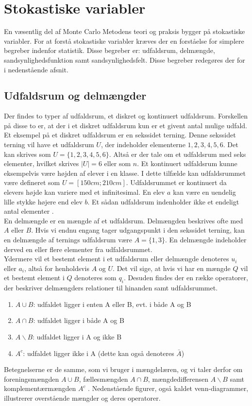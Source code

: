 \documentclass[../../SRP.tex]{subfiles}
\begin{document}
\chapter{Stokastiske variabler}

En væsentlig del af Monte Carlo Metodens teori og praksis bygger på stokastiske variabler. For at forstå stokastiske variabler kræves der en forståelse for simplere begreber indenfor statistik. Disse begreber er: udfaldsrum, delmængde, sandsynlighedsfunktion samt sandsynlighedsfelt. Disse begreber redegøres der for i nedenstående afsnit.

\section{Udfaldsrum og delmængder}

Der findes to typer af udfaldsrum, et diskret og kontinuert udfaldsrum. Forskellen på disse to er, at der i et diskret udfaldsrum kun er et givent antal mulige udfald. Et eksempel på et diskret udfaldsrum er en sekssidet terning. Denne sekssidet terning vil have et udfaldsrum $U$, der indeholder elementerne $1,2,3,4,5,6$. Det kan skrives som $U = \{1,2,3,4,5,6\}$. Altså er der tale om et udfaldsrum med seks elementer, hvilket skrives $|U| = 6$ eller som $n$. Et kontinuert udfaldsrum kunne eksempelvis være højden af elever i en klasse. I dette tilfælde kan udfaldsrummet være defineret som $U = [150cm;210cm]$. Udfaldsrummet er kontinuert da elevers højde kan variere med et infinitesimal. En elev $a$ kan være en uendelig lille stykke højere end elev $b$. Et sådan udfaldsrum indenholder ikke et endeligt antal elementer \cite{SC}. \\

En delmængde er en mængde af et udfaldsrum. Delmængden beskrives ofte med $A$ eller $B$. Hvis vi endnu engang tager udgangspunkt i den sekssidet terning, kan en delmængde af ternings udfaldsrum være $A = \{1,3\}$. En delmængde indeholder derved en eller flere elementer fra udfaldsrummet. \\

Ydermere vil et bestemt element i et udfaldsrum eller delmængde denoteres $u_i$ eller $a_i$, altså for henholdsvis $A$ og $U$. Det vil sige, at hvis vi har en mængde $Q$ vil et bestemt element i $Q$ denoteres som $q_i$. Desuden findes der en række operatorer, der beskriver delmængders relationer til hinanden samt udfaldsrummet.
\begin{enumerate}
  \item $A \cup B$: udfaldet ligger i enten A eller B, evt. i både A og B
  \item $A \cap B$: udfaldet ligger i både A og B
  \item $A \backslash B$: udfaldet ligger i A og ikke B
  \item $A^c$: udfaldet ligger ikke i A (dette kan også denoteres $\bar{A}$)
\end{enumerate}
Betegnelserne er de samme, som vi bruger i mængdelæren, og vi taler derfor om foreningsmængden $A \cup B$, fællesmængden $A \cap B$, mængdedifferensen $A \backslash B$ samt komplementærmængden $A^c$ \cite[p.~16]{SC}. Nedenstående figurer, også kaldet venn-diagrammer, illustrerer overstående mængder og deres operatorer.
\end{document}
